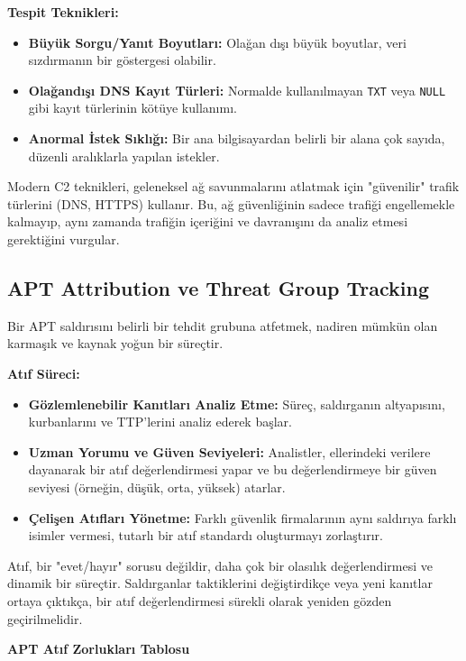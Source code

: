 \textbf{Tespit Teknikleri:}
\begin{itemize}
    \item \textbf{Büyük Sorgu/Yanıt Boyutları:} Olağan dışı büyük boyutlar, veri sızdırmanın bir göstergesi olabilir.
    \item \textbf{Olağandışı DNS Kayıt Türleri:} Normalde kullanılmayan \texttt{TXT} veya \texttt{NULL} gibi kayıt türlerinin kötüye kullanımı.
    \item \textbf{Anormal İstek Sıklığı:} Bir ana bilgisayardan belirli bir alana çok sayıda, düzenli aralıklarla yapılan istekler.
\end{itemize}

Modern C2 teknikleri, geleneksel ağ savunmalarını atlatmak için "güvenilir" trafik türlerini (DNS, HTTPS) kullanır. Bu, ağ güvenliğinin sadece trafiği engellemekle kalmayıp, aynı zamanda trafiğin içeriğini ve davranışını da analiz etmesi gerektiğini vurgular.

\subsection{APT Attribution ve Threat Group Tracking}

Bir APT saldırısını belirli bir tehdit grubuna atfetmek, nadiren mümkün olan karmaşık ve kaynak yoğun bir süreçtir.

\textbf{Atıf Süreci:}

\begin{itemize}
    \item \textbf{Gözlemlenebilir Kanıtları Analiz Etme:} Süreç, saldırganın altyapısını, kurbanlarını ve TTP'lerini analiz ederek başlar.
    \item \textbf{Uzman Yorumu ve Güven Seviyeleri:} Analistler, ellerindeki verilere dayanarak bir atıf değerlendirmesi yapar ve bu değerlendirmeye bir güven seviyesi (örneğin, düşük, orta, yüksek) atarlar.
    \item \textbf{Çelişen Atıfları Yönetme:} Farklı güvenlik firmalarının aynı saldırıya farklı isimler vermesi, tutarlı bir atıf standardı oluşturmayı zorlaştırır.
\end{itemize}

Atıf, bir "evet/hayır" sorusu değildir, daha çok bir olasılık değerlendirmesi ve dinamik bir süreçtir. Saldırganlar taktiklerini değiştirdikçe veya yeni kanıtlar ortaya çıktıkça, bir atıf değerlendirmesi sürekli olarak yeniden gözden geçirilmelidir.

\textbf{APT Atıf Zorlukları Tablosu}

